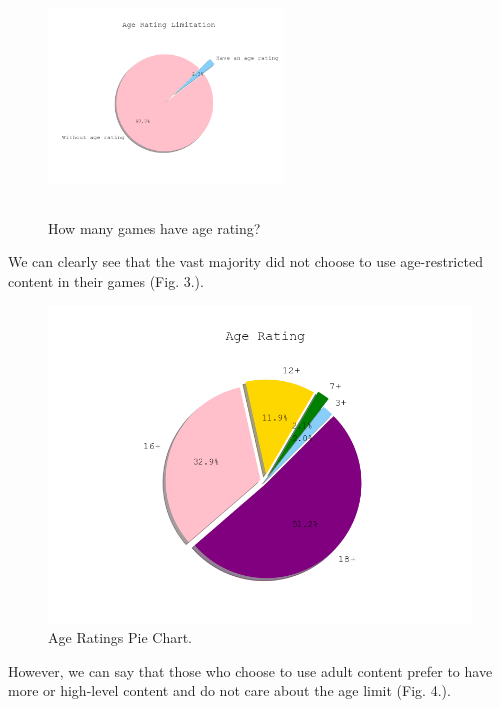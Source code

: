 \documentclass[conference]{IEEEtran}
\begin{document}
\begin{figure}[ht]
  \centering
  \includegraphics[width=6.25cm,height=6.25cm,keepaspectratio]{assets/age_rating_pie.png}
  \caption{How many games have age rating?}
  \label{fig:agerating1}
\end{figure}

We can clearly see that the vast majority did not choose to use age-restricted content in their games (Fig. 3.).

\begin{figure}[ht]
  \includegraphics[width=\linewidth]{assets/age_rating_has_pie.png}
  \caption{Age Ratings Pie Chart.}
  \label{fig:agerating2}
\end{figure}

However, we can say that those who choose to use adult content prefer to have more or high-level content and do not care about the age limit (Fig. 4.). 
\end{document}
